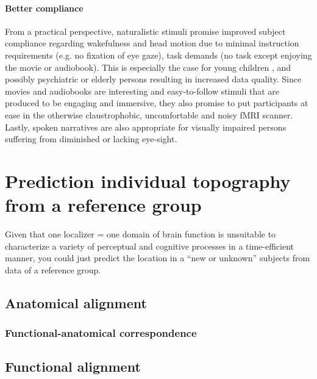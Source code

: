 \paragraph{Better compliance}

%
From a practical perspective, naturalistic stimuli promise improved subject
compliance regarding wakefulness and head motion due to minimal instruction
requirements (e.g. no fixation of eye gaze), task demands (no task except
enjoying the movie or audiobook).
%
This is especially the case for young children \citep{vanderwal2015inscapes},
and possibly psychiatric \citep{eickhoff2020towards} or elderly persons
resulting in increased data quality.
%
Since movies and audiobooks are interesting and easy-to-follow stimuli that are
produced to be engaging and immersive, they also promise to put participants at
ease in the otherwise claustrophobic, uncomfortable and noisy fMRI scanner.
%
Lastly, spoken narratives are also appropriate for visually impaired persons
suffering from diminished or lacking eye-sight.


\section{Prediction individual topography from a reference group}

Given that one localizer = one domain of brain function is unsuitable to
characterize a variety of perceptual and cognitive processes in a time-efficient
manner, you could just predict the location in a ``new or  unknown'' subjects
from data of a reference group.


\subsection{Anatomical alignment}


\subsubsection{Functional-anatomical correspondence}


\subsection{Functional alignment}



